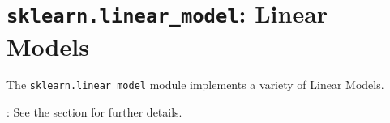 \chapter{\texttt{sklearn.linear\_model}: Linear Models}
The \texttt{sklearn.linear\_model} module implements a variety of Linear Models.

: See the  section for further details.